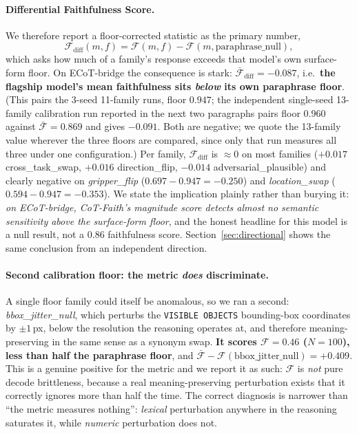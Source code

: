 \documentclass{article}
\begin{document}
\paragraph{Differential Faithfulness Score.} We therefore report a floor-corrected statistic as the primary number,
\begin{equation}
\mathcal{F}_{\text{diff}}(m, f) = \mathcal{F}(m, f) - \mathcal{F}(m, \text{paraphrase\_null}),
\label{eq:fdiff}
\end{equation}
which asks how much of a family's response exceeds that model's own surface-form floor. On ECoT-bridge the consequence is stark: $\bar{\mathcal{F}}_{\text{diff}} = -0.087$, i.e.\ \textbf{the flagship model's mean faithfulness sits \emph{below} its own paraphrase floor}. (This pairs the 3-seed 11-family runs, floor $0.947$; the independent single-seed 13-family calibration run reported in the next two paragraphs pairs floor $0.960$ against $\bar{\mathcal{F}} = 0.869$ and gives $-0.091$. Both are negative; we quote the 13-family value wherever the three floors are compared, since only that run measures all three under one configuration.) Per family, $\mathcal{F}_{\text{diff}}$ is $\approx 0$ on most families ($+0.017$ cross\_task\_swap, $+0.016$ direction\_flip, $-0.014$ adversarial\_plausible) and clearly negative on \emph{gripper\_flip} ($0.697 - 0.947 = -0.250$) and \emph{location\_swap} ($0.594 - 0.947 = -0.353$). We state the implication plainly rather than burying it: \emph{on ECoT-bridge, CoT-Faith's magnitude score detects almost no semantic sensitivity above the surface-form floor}, and the honest headline for this model is a null result, not a $0.86$ faithfulness score. Section~\ref{sec:directional} shows the same conclusion from an independent direction.

\paragraph{Second calibration floor: the metric \emph{does} discriminate.} A single floor family could itself be anomalous, so we ran a second: \emph{bbox\_jitter\_null}, which perturbs the \texttt{VISIBLE OBJECTS} bounding-box coordinates by $\pm 1$\,px, below the resolution the reasoning operates at, and therefore meaning-preserving in the same sense as a synonym swap. \textbf{It scores $\mathcal{F} = 0.46$ ($N{=}100$), less than half the paraphrase floor}, and $\bar{\mathcal{F}} - \mathcal{F}(\text{bbox\_jitter\_null}) = +0.409$. This is a genuine positive for the metric and we report it as such: $\mathcal{F}$ is \emph{not} pure decode brittleness, because a real meaning-preserving perturbation exists that it correctly ignores more than half the time. The correct diagnosis is narrower than ``the metric measures nothing'': \emph{lexical} perturbation anywhere in the reasoning saturates it, while \emph{numeric} perturbation does not.
\end{document}
